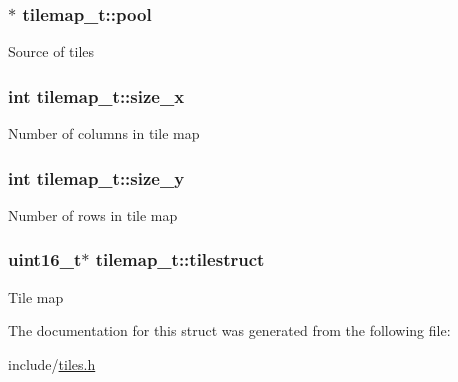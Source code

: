 \subsubsection[{\texorpdfstring{pool}{pool}}]{$\ast$ tilemap\+\_\+t\+::pool}\hypertarget{structtilemap__t_a4a251531ed02240ed1c0cbb50688cb14}{}\label{structtilemap__t_a4a251531ed02240ed1c0cbb50688cb14}
Source of tiles 
\subsubsection[{\texorpdfstring{size\+\_\+x}{size\_x}}]{\setlength{\rightskip}{0pt plus 5cm}int tilemap\+\_\+t\+::size\+\_\+x}\hypertarget{structtilemap__t_a294a1064701b2f0d356919c24814a678}{}\label{structtilemap__t_a294a1064701b2f0d356919c24814a678}
Number of columns in tile map 
\subsubsection[{\texorpdfstring{size\+\_\+y}{size\_y}}]{\setlength{\rightskip}{0pt plus 5cm}int tilemap\+\_\+t\+::size\+\_\+y}\hypertarget{structtilemap__t_a555e62b4a049be1c58a2bb7484bdf0c1}{}\label{structtilemap__t_a555e62b4a049be1c58a2bb7484bdf0c1}
Number of rows in tile map 
\subsubsection[{\texorpdfstring{tilestruct}{tilestruct}}]{\setlength{\rightskip}{0pt plus 5cm}uint16\+\_\+t$\ast$ tilemap\+\_\+t\+::tilestruct}\hypertarget{structtilemap__t_aa8265d7200ace9d16f81dd5600958c34}{}\label{structtilemap__t_aa8265d7200ace9d16f81dd5600958c34}
Tile map 

The documentation for this struct was generated from the following file\+:\begin{DoxyCompactItemize}
\item 
include/\hyperlink{tiles_8h}{tiles.\+h}\end{DoxyCompactItemize}

